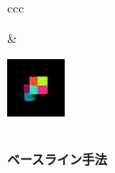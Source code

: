 \begin{figure}[tbp]
\begin{center}
\begin{tabular}{ccc}
\begin{minipage}{0.33\linewidth}
\begin{center}
        \end{center}
      \end{minipage} &
      \begin{minipage}{0.33\linewidth}
        \begin{center}
          \includegraphics[width=\linewidth]{./figures/baseline_pred_3.png}
        \end{center}
      \end{minipage} \\
       {\bf ベースライン手法} \\
      \begin{minipage}{0.33\linewidth}
        \begin{center}

\end{center}
\end{minipage}
\end{tabular}
\end{center}
\end{figure}
